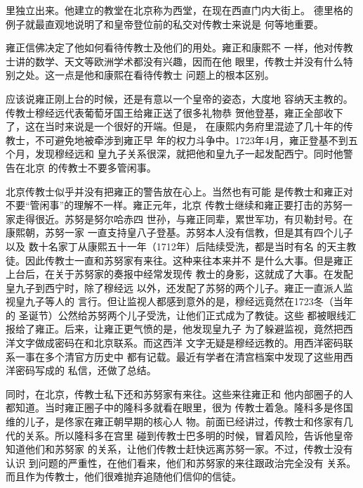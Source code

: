 里独立出来。他建立的教堂在北京称为西堂，在现在西直门内大街上。%
德里格的例子就最直观地说明了和皇帝登位前的私交对传教士来说是%
何等地重要。%
\par
雍正信佛决定了他如何看待传教士及他们的用处。雍正和康熙不%
一样，他对传教士讲的数学、天文等欧洲学术都没有兴趣，因而在他%
眼里，传教士并没有什么特别之处。这一点是他和康熙在看待传教士%
问题上的根本区别。%
\par
应该说雍正刚上台的时候，还是有意以一个皇帝的姿态，大度地%
容纳天主教的。传教士穆经远代表葡萄牙国王给雍正送了很多礼物恭%
贺他登基，雍正全部收下了，这在当时来说是一个很好的开端。但是，%
在康熙内务府里混迹了几十年的传教士，不可避免地被牵涉到雍正早%
年的权力斗争中。1723年4月，雍正登基不到五个月，发现穆经远和%
皇九子关系很深，就把他和皇九子一起发配西宁。同时他警告在北京%
的传教士不要多管闲事。%
\par
北京传教士似乎并没有把雍正的警告放在心上。当然也有可能%
是传教士和雍正对不要“管闲事”的理解不一样。雍正元年，北京%
传教士继续和雍正要打击的苏努一家走得很近。苏努是努尔哈赤四%
世孙，与雍正同辈，累世军功，有贝勒封号。在康熙朝，苏努一家%
一直支持皇八子登基。苏努本人没有信教，但是其有四个儿子以及%
数十名家丁从康熙五十一年（1712年）后陆续受洗，都是当时有名%
的天主教徒。因此传教士一直和苏努家有来往。这种来往本来并不%
是什么大事。但是雍正上台后，在关于苏努家的奏报中经常发现传%
教士的身影，这就成了大事。在发配皇九子到西宁时，除了穆经远%
以外，还发配了苏努的两个儿子。雍正一直派人监视皇九子等人的%
言行。但让监视人都感到意外的是，穆经远竟然在1723冬（当年的%
圣诞节）公然给苏努两个儿子受洗，让他们正式成为了教徒。这些%
都被眼线汇报给了雍正。后来，让雍正更气愤的是，他发现皇九子%
为了躲避监视，竟然把西洋文字做成密码在和北京联系。而这西洋%
文字无疑是穆经远教的。用西洋密码联系一事在多个清官方历史中%
都有记载。最近有学者在清宫档案中发现了这些用西洋密码写成的%
私信，还做了总结。%
\par
同时，在北京，传教士私下还和苏努家有来往。这些来往雍正和%
他内部圈子的人都知道。当时雍正圈子中的隆科多就看在眼里，很为%
传教士着急。隆科多是佟国维的儿子，是佟家在雍正朝早期的核心人%
物。前面已经讲过，传教士和佟家有几代的关系。所以隆科多在宫里%
碰到传教士巴多明的时候，冒着风险，告诉他皇帝知道他们和苏努家%
的关系，让他们传教士赶快远离苏努一家。不过，传教士没有认识%
到问题的严重性，在他们看来，他们和苏努家的来往跟政治完全没有%
关系。而且作为传教士，他们很难抛弃追随他们信仰的信徒。%
\par

